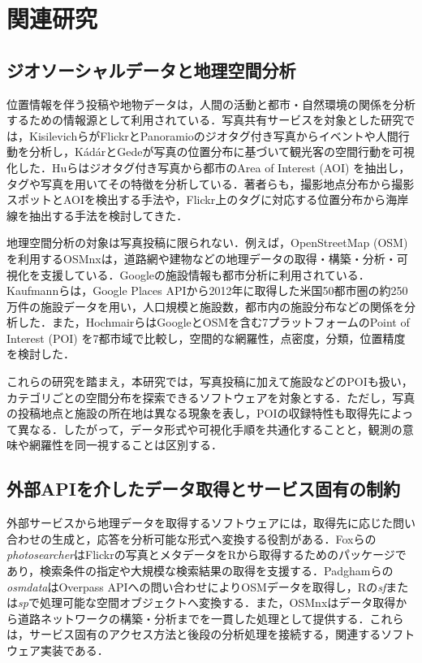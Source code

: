 \section{関連研究}
\label{sec:related-work}

\subsection{ジオソーシャルデータと地理空間分析}

位置情報を伴う投稿や地物データは，人間の活動と都市・自然環境の関係を分析するための情報源として利用されている．写真共有サービスを対象とした研究では，KisilevichらがFlickrとPanoramioのジオタグ付き写真からイベントや人間行動を分析し\cite{kisilevich2010eventbased}，K{\'a}d{\'a}rとGedeが写真の位置分布に基づいて観光客の空間行動を可視化した\cite{kadar2013wheredotouristsgo}．Huらはジオタグ付き写真から都市のArea of Interest (AOI) を抽出し，タグや写真を用いてその特徴を分析している\cite{hu2015extractingAOI}．著者らも，撮影地点分布から撮影スポットとAOIを検出する手法\cite{shirai2013aoi}や，Flickr上のタグに対応する位置分布から海岸線を抽出する手法\cite{omori2014coastlines}を検討してきた．

地理空間分析の対象は写真投稿に限られない．例えば，OpenStreetMap (OSM) を利用するOSMnxは，道路網や建物などの地理データの取得・構築・分析・可視化を支援している\cite{boeing2017osmnx}．Googleの施設情報も都市分析に利用されている．Kaufmannらは，Google Places APIから2012年に取得した米国50都市圏の約250万件の施設データを用い，人口規模と施設数，都市内の施設分布などの関係を分析した\cite{kaufmann2022amenities}．また，HochmairらはGoogleとOSMを含む7プラットフォームのPoint of Interest (POI) を7都市域で比較し，空間的な網羅性，点密度，分類，位置精度を検討した\cite{hochmair2018poiquality}．

これらの研究を踏まえ，本研究では，写真投稿に加えて施設などのPOIも扱い，カテゴリごとの空間分布を探索できるソフトウェアを対象とする．ただし，写真の投稿地点と施設の所在地は異なる現象を表し，POIの収録特性も取得先によって異なる．したがって，データ形式や可視化手順を共通化することと，観測の意味や網羅性を同一視することは区別する．

\subsection{外部APIを介したデータ取得とサービス固有の制約}

外部サービスから地理データを取得するソフトウェアには，取得先に応じた問い合わせの生成と，応答を分析可能な形式へ変換する役割がある．Foxらの\textit{photosearcher}はFlickrの写真とメタデータをRから取得するためのパッケージであり，検索条件の指定や大規模な検索結果の取得を支援する\cite{fox2020photosearcher}．Padghamらの\textit{osmdata}はOverpass APIへの問い合わせによりOSMデータを取得し，Rの\textit{sf}または\textit{sp}で処理可能な空間オブジェクトへ変換する\cite{padgham2017osmdata}．また，OSMnxはデータ取得から道路ネットワークの構築・分析までを一貫した処理として提供する\cite{boeing2017osmnx}．これらは，サービス固有のアクセス方法と後段の分析処理を接続する，関連するソフトウェア実装である．

